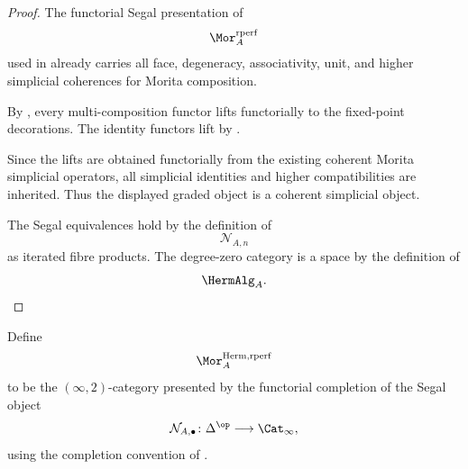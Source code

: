 \begin{proof}
The functorial Segal presentation of
\[
    \Mor_A^{\mathrm{rperf}}
\]
used in
already carries all face, degeneracy, associativity, unit, and higher
simplicial coherences for Morita composition.

By
,
every multi-composition functor lifts functorially to the fixed-point
decorations. The identity functors lift by
.

Since the lifts are obtained functorially from the existing coherent
Morita simplicial operators, all simplicial identities and higher
compatibilities are inherited. Thus the displayed graded object is a
coherent simplicial object.

The Segal equivalences hold by the definition of
\[
    \mathcal N_{A,n}
\]
as iterated fibre products. The degree-zero category is a space by the
definition of
\[
    \HermAlg_A.
\]
\end{proof}

\begin{construction}
\label{con:global-hermitian-right-perfect-morita}
Define
\[
    \Mor_A^{\mathrm{Herm,rperf}}
\]
to be the $(\infty,2)$-category presented by the functorial completion
of the Segal object
\[
    \mathcal N_{A,\bullet}
    \colon
    \Delta^{\op}
    \longrightarrow
    \Cat_\infty,
\]
using the completion convention of
.
\end{construction}

